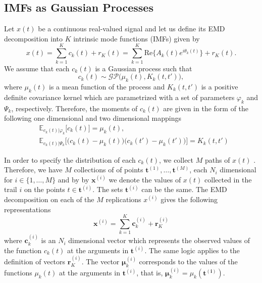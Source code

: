 \subsection{IMFs as Gaussian Processes}
Let $x(t)$ be a continuous real-valued signal and let us define its EMD decomposition into $K$ intrinsic mode functions (IMFs) given by 
\begin{equation}\label{eq:model_x_EMD}
x(t) = \sum_{k = 1}^K c_k(t) + r_K(t) = \sum_{k = 1}^K \text{Re}\Big\{ A_k(t)  e^{i \theta_k(t)} \Big\} + r_K(t).
\end{equation}
We assume that each $c_k(t)$ is a Gaussian process such that 
\begin{equation}\label{eq:model_IMF_GP_k}
c_k(t) \sim \mathcal{GP} \Big( \mu_k(t), K_k(t,t')\Big), 
\end{equation}
where $\mu_k(t)$ is a mean function of the process and $K_k(t,t')$ is a positive definite covariance kernel which are parametrized with a set of parameters $\varphi_{k}$ and $\Psi_{k}$, respectively. Therefore, the moments of $c_k(t)$ are given in the form of the following one dimensional and two dimensional mappings
\begin{align*}
&\mathbb{E}_{ c_k(t)| \varphi_{k}} \big[ c_k(t)\big] = \mu_k(t), \\
& \mathbb{E}_{ c_k(t)| \Psi_{k}} \Big[ \big(c_k(t) - \mu_k(t) \big)\big(c_k(t') - \mu_k(t') \big) \Big] = K_k(t,t')
\end{align*}

In order to specify the distribution of each $c_k(t)$, we collect $M$ paths of $x(t)$ . Therefore, we have $M$ collections of of points $\mathbf{t}^{(1)} , \ldots, \mathbf{t}^{(M)}$, each $N_i$ dimensional for $i \in \Big\{1,\ldots,M\Big\}$ and by  by $\mathbf{x}^{(i)}$ we denote the values of $x(t)$ collected in the trail $i$ on the points $t \in \mathbf{t}^{(i)}$.  The sets $\mathbf{t}^{(i)}$ can be the same.
The EMD decomposition on each of the $M$ replications  $x^{(i)}$ gives the following representations
\begin{equation}
\mathbf{x}^{(i)} = \sum_{k = 1}^K \mathbf{c}_k^{(i)}+ \mathbf{r}^{(i)}_K 
\end{equation}
where $\mathbf{c}_k^{(i)}$ is an $N_i$ dimensional vector which represents the observed values of the function $c_k(t)$ at the arguments in $\mathbf{t}^{(i)}$. The same logic applies to the definition of vectors $\mathbf{r}^{(i)}_K $. The vector $\bm{\mu}_k^{(i)}$  corresponds to the values of the functions $\mu_k(t)$ at the arguments in $\mathbf{t}^{(i)}$, that is, $\bm{\mu}_k^{(i)} = \mu_k(\mathbf{\mathbf{t}^{(i)}})$.

